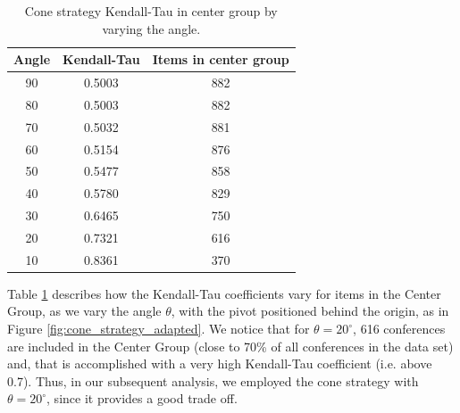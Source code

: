\documentclass[man]{apa6}
\begin{document}
\begin{table}[h!]
\centering
 \begin{tabular}{c c c} 
 \toprule
 Angle & Kendall-Tau & Items in center group \\ 
 \midrule
 
 90 & 0.5003 & 882 \\
 80 & 0.5003 & 882 \\
 70 & 0.5032 & 881 \\
 60 & 0.5154 & 876 \\
 50 & 0.5477 & 858 \\
 40 & 0.5780 & 829 \\
 30 & 0.6465 & 750 \\
 20 & 0.7321 & 616 \\
 10 & 0.8361 & 370 \\
 \bottomrule
 \end{tabular}
 \caption{Cone strategy Kendall-Tau in center group by varying the angle.}
 \label{tab:cone_strategy}
\end{table}

Table \ref{tab:cone_strategy} describes how the Kendall-Tau coefficients vary for items in the Center Group, as we vary the angle $ \theta $, with the pivot positioned behind the origin, as in Figure \ref{fig:cone_strategy_adapted}. We notice that for $ \theta = 20^{\circ} $, 616 conferences are included in the Center
Group (close to 70\% of all conferences in the data set) and, that is accomplished with a very high Kendall-Tau 
coefficient (i.e. above 0.7). Thus, in our subsequent 
analysis, we employed the cone strategy with $ \theta = 20^{\circ} $, since it provides a good trade off.
\end{document}
